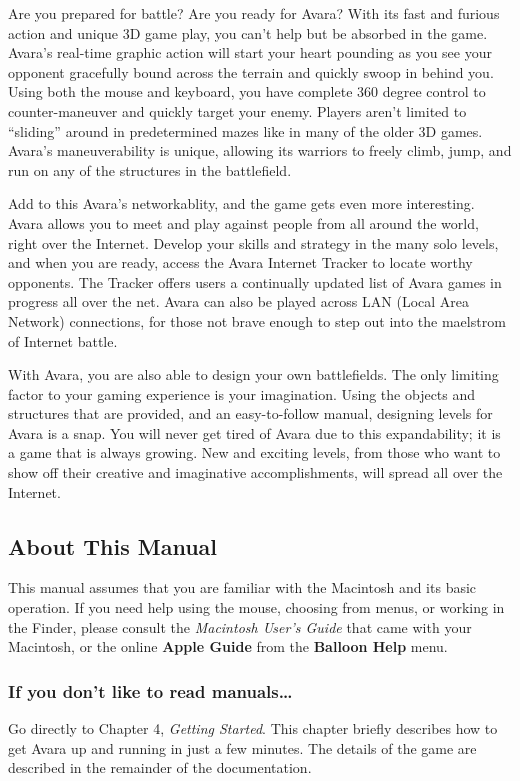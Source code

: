 \documentclass{article}
\begin{document}
Are you prepared for battle? Are you ready for Avara? With its fast and furious action and unique 3D game play, you can't help but be absorbed in the game. Avara's real-time graphic action will start your heart pounding as you see your opponent gracefully bound across the terrain and quickly swoop in behind you. Using both the mouse and keyboard, you have complete 360 degree control to counter-maneuver and quickly target your enemy. Players aren't limited to ``sliding'' around in predetermined mazes like in many of the older 3D games. Avara's maneuverability is unique, allowing its warriors to freely climb, jump, and run on any of the structures in the battlefield.

Add to this Avara's networkablity, and the game gets even more interesting. Avara allows you to meet and play against people from all around the world, right over the Internet. Develop your skills and strategy in the many solo levels, and when you are ready, access the Avara Internet Tracker to locate worthy opponents. The Tracker offers users a continually updated list of Avara games in progress all over the net. Avara can also be played across LAN (Local Area Network) connections, for those not brave enough to step out into the maelstrom of Internet battle.

With Avara, you are also able to design your own battlefields. The only limiting factor to your gaming experience is your imagination. Using the objects and structures that are provided, and an easy-to-follow manual, designing levels for Avara is a snap. You will never get tired of Avara due to this expandability; it is a game that is always growing. New and exciting levels, from those who want to show off their creative and imaginative accomplishments, will spread all over the Internet.

\subsection{About This Manual}

This manual assumes that you are familiar with the Macintosh and its basic operation. If you need help using the mouse, choosing from menus, or working in the Finder, please consult the \textit{Macintosh User's Guide} that came with your Macintosh, or the online \textbf{Apple Guide} from the \textbf{Balloon Help} menu.

\subsubsection{If you don't like to read manuals\dots}
Go directly to Chapter 4, \textit{Getting Started}. This chapter briefly describes how to get Avara up and running in just a few minutes. The details of the game are described in the remainder of the documentation.
\end{document}
